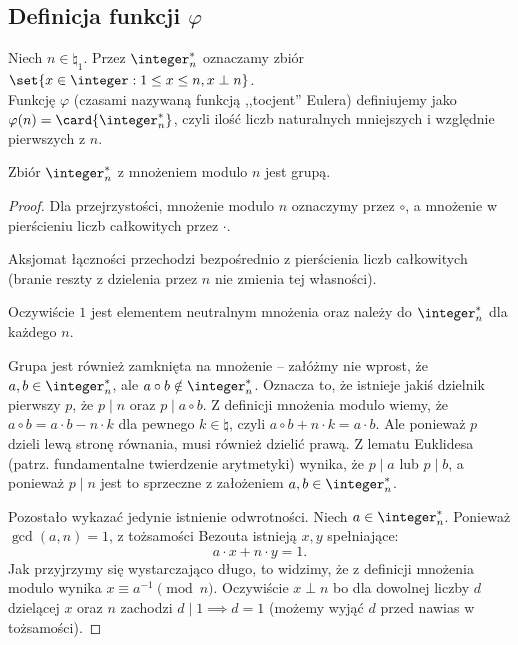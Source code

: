 \subsection{Definicja funkcji \texorpdfstring{$\varphi$}{phi}}
\begin{definition}
	Niech $n \in \natural_1$. Przez $\integer_n^*$ oznaczamy zbiór $\set{x \in \integer: 1 \leq x \leq n, x \perp n}$. \\
	Funkcję $\varphi$ (czasami nazywaną funkcją ,,tocjent'' Eulera) definiujemy jako
	$\varphi(n) = \card{\integer_n^*}$, czyli ilość liczb naturalnych mniejszych i względnie pierwszych z $n$.
\end{definition}

\begin{theorem}
	\label{nt:phigrupa}
	Zbiór $\integer_n^*$ z mnożeniem modulo $n$ jest grupą.
\end{theorem}
\begin{proof}
	Dla przejrzystości, mnożenie modulo $n$ oznaczymy przez $\circ$, a mnożenie w pierścieniu liczb całkowitych przez $\cdot$.

	Aksjomat łączności przechodzi bezpośrednio z pierścienia liczb całkowitych (branie reszty z dzielenia przez $n$ nie zmienia tej własności).

	Oczywiście $1$ jest elementem neutralnym mnożenia oraz należy do $\integer_n^*$ dla każdego $n$.

	Grupa jest również zamknięta na mnożenie -- załóżmy nie wprost, że $a,b \in \integer_n^*$, ale $a \circ b \notin \integer_n^*$.
	Oznacza to, że istnieje jakiś dzielnik pierwszy $p$, że $p \mid n$ oraz $p \mid a \circ b$.
	Z definicji mnożenia modulo wiemy, że $a \circ b = a \cdot b - n \cdot k$ dla pewnego $k \in \natural$, czyli
	$a \circ b + n \cdot k = a \cdot b$. Ale ponieważ $p$ dzieli lewą stronę równania, musi również
	dzielić prawą. Z lematu Euklidesa (patrz. fundamentalne twierdzenie arytmetyki) wynika, że
	$p \mid a$ lub $p \mid b$, a ponieważ $p \mid n$ jest to sprzeczne z założeniem $a, b \in \integer_n^*$.

	Pozostało wykazać jedynie istnienie odwrotności. Niech $a \in \integer_n^*$. Ponieważ
	$\gcd(a, n) = 1$, z tożsamości Bezouta istnieją $x, y$ spełniające:
	$$a \cdot x + n \cdot y = 1.$$ Jak przyjrzymy się wystarczająco długo,
	to widzimy, że z definicji mnożenia modulo wynika $x \equiv a^{-1} \pmod n$.
	Oczywiście $x \perp n$ bo dla dowolnej liczby $d$ dzielącej $x$ oraz $n$
	zachodzi $d \mid 1 \implies d = 1$ (możemy wyjąć $d$ przed nawias w tożsamości).
\end{proof}

